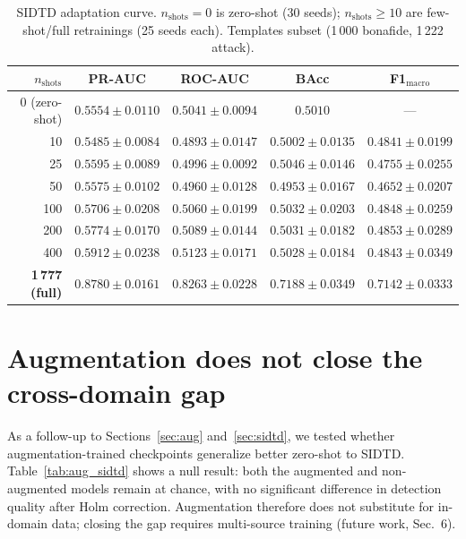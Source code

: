 \documentclass[11pt]{article}
\begin{document}
\begin{table}[h]
  \centering
  \caption{SIDTD adaptation curve. $n_{\text{shots}}=0$ is zero-shot
           (30 seeds); $n_{\text{shots}}\geq10$ are few-shot/full retrainings
           (25 seeds each). Templates subset (1\,000 bonafide, 1\,222 attack).}
  \label{tab:sidtd}
  \begin{tabular}{rcccc}
    \toprule
    $n_{\text{shots}}$ & PR-AUC & ROC-AUC & BAcc & F1$_{\text{macro}}$ \\
    \midrule
    0 (zero-shot) & $0.5554\pm0.0110$ & $0.5041\pm0.0094$ & $0.5010$ & --- \\
    10   & $0.5485\pm0.0084$ & $0.4893\pm0.0147$ & $0.5002\pm0.0135$ & $0.4841\pm0.0199$ \\
    25   & $0.5595\pm0.0089$ & $0.4996\pm0.0092$ & $0.5046\pm0.0146$ & $0.4755\pm0.0255$ \\
    50   & $0.5575\pm0.0102$ & $0.4960\pm0.0128$ & $0.4953\pm0.0167$ & $0.4652\pm0.0207$ \\
    100  & $0.5706\pm0.0208$ & $0.5060\pm0.0199$ & $0.5032\pm0.0203$ & $0.4848\pm0.0259$ \\
    200  & $0.5774\pm0.0170$ & $0.5089\pm0.0144$ & $0.5031\pm0.0182$ & $0.4853\pm0.0289$ \\
    400  & $0.5912\pm0.0238$ & $0.5123\pm0.0171$ & $0.5028\pm0.0184$ & $0.4843\pm0.0349$ \\
    \textbf{1\,777 (full)} & $\mathbf{0.8780\pm0.0161}$ & $\mathbf{0.8263\pm0.0228}$ & $\mathbf{0.7188\pm0.0349}$ & $\mathbf{0.7142\pm0.0333}$ \\
    \bottomrule
  \end{tabular}
\end{table}

\section{Augmentation does not close the cross-domain gap}
\label{sec:aug_sidtd}

As a follow-up to Sections~\ref{sec:aug} and~\ref{sec:sidtd}, we tested whether
augmentation-trained checkpoints generalize better zero-shot to SIDTD.
Table~\ref{tab:aug_sidtd} shows a null result: both the augmented and
non-augmented models remain at chance, with no significant difference in
detection quality after Holm correction. Augmentation therefore does not
substitute for in-domain data; closing the gap requires multi-source training
(future work, Sec.~6).
\end{document}
